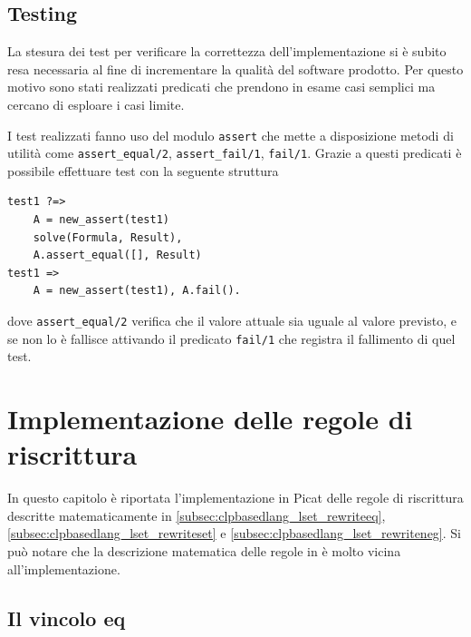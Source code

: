 \documentclass[12pt,a4paper,openright]{book} %
\begin{document}
\section{Testing}
\label{sec:lsetpicat_testing}

La stesura dei test per verificare la correttezza dell'implementazione
si è subito resa necessaria al fine di incrementare la qualità del
software prodotto. Per questo motivo sono stati realizzati predicati
che prendono in esame casi semplici ma cercano di esploare i casi
limite.

I test realizzati fanno uso del modulo \verb|assert| che mette a
disposizione metodi di utilità come \verb|assert_equal/2|,
\verb|assert_fail/1|, \verb|fail/1|. Grazie a questi predicati è
possibile effettuare test con la seguente struttura
\begin{verbatim}
test1 ?=>
    A = new_assert(test1)
    solve(Formula, Result),
    A.assert_equal([], Result)
test1 =>
    A = new_assert(test1), A.fail().
\end{verbatim}
dove \verb|assert_equal/2| verifica che il valore attuale sia uguale
al valore previsto, e se non lo è fallisce attivando il predicato
\verb|fail/1| che registra il fallimento di quel test.



\chapter{Implementazione delle regole di riscrittura}
\label{ch:impl}

\minitoc

In questo capitolo è riportata l'implementazione in Picat delle regole
di riscrittura descritte matematicamente in
\ref{subsec:clpbasedlang_lset_rewriteeq},
\ref{subsec:clpbasedlang_lset_rewriteset} e
\ref{subsec:clpbasedlang_lset_rewriteneg}. Si può notare che la
descrizione matematica delle regole in \cite{Rossi18} è molto vicina
all’implementazione.

\section{Il vincolo eq}
\end{document}
